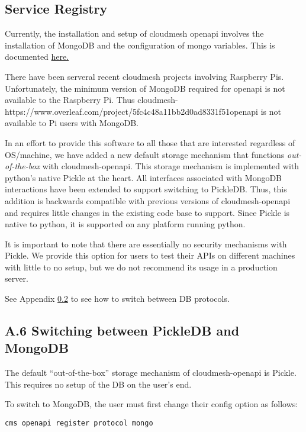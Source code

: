 \subsection{Service Registry}
\label{sec:registry}

Currently, the installation and setup of cloudmesh openapi involves the
installation of MongoDB and the configuration of mongo variables. This
is documented
\href{https://github.com/cloudmesh/cloudmesh-openapi\#installation}{here.}

There have been serveral recent cloudmesh projects involving Raspberry
Pis. Unfortunately, the minimum version of MongoDB required for openapi
is not available to the Raspberry Pi. Thus cloudmesh-https://www.overleaf.com/project/5fc4c48a11bb2d0ad8331f51openapi is not
available to Pi users with MongoDB.

In an effort to provide this software to all those that are interested
regardless of OS/machine, we have added a new default storage mechanism
that functions {\em out-of-the-box} with cloudmesh-openapi. This storage
mechanism is implemented with python's native Pickle at the heart. All
interfaces associated with MongoDB interactions have been extended to
support switching to PickleDB. Thus, this addition is backwards
compatible with previous versions of cloudmesh-openapi and requires
little changes in the existing code base to support. Since Pickle is
native to python, it is supported on any platform running python.

It is important to note that there are essentially no security
mechanisms with Pickle. We provide this option for users to test their
APIs on different machines with little to no setup, but we do not
recommend its usage in a production server.

See Appendix \ref{a.6-switching-between-pickledb-and-mongodb} 
to see how to switch between DB protocols.

\subsection{A.6 Switching between PickleDB and
MongoDB}\label{a.6-switching-between-pickledb-and-mongodb}

The default ``out-of-the-box'' storage mechanism of cloudmesh-openapi is
Pickle. This requires no setup of the DB on the user's end.

To switch to MongoDB, the user must first change their config option as
follows:

\begin{verbatim}
cms openapi register protocol mongo
\end{verbatim}


